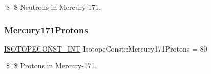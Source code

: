 \$ \$ Neutrons in Mercury-\/171. \mbox{\label{group___isotope_const-_mercury-_hg171_ga9aec4015a98114c6dfc43f00d72edab7}} 
\subsubsection{\texorpdfstring{Mercury171\+Protons}{Mercury171Protons}}
{\footnotesize\ttfamily \mbox{\hyperlink{group___isotope_const-_macros_ga5f18360b3e99483a35c32d789e62621c}{I\+S\+O\+T\+O\+P\+E\+C\+O\+N\+S\+T\+\_\+\+I\+NT}} Isotope\+Const\+::\+Mercury171\+Protons = 80}

\$ \$ Protons in Mercury-\/171. 
